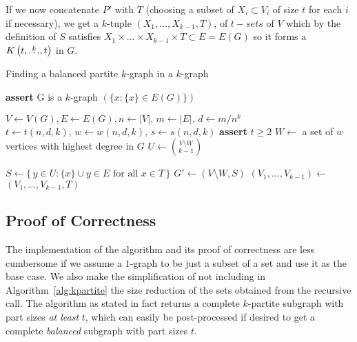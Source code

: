 If we now concatenate $P'$ with $T$ (choosing a subset of $X_i \subset V_i$ of size $t$ for each $i$ if necessary), we get
a $k$-tuple $(X_1, \dots, X_{k-1}, T)$, of $t-sets$ of $V$ %
which by the definition of $S$ satisfies
$X_1 \times \dots \times X_{k-1} \times T \subset E = E(G)$
so it forms a $K\left(t, \overset{k}{\dots}, t\right)$ in $G$.

\begin{algorithm}[H]
    \caption{Finding a balanced partite $k$-graph in a $k$-graph}
    \label{alg:kpartite}
    \begin{algorithmic}[1]
            \State \textbf{assert} G is a $k$-graph
             \label{line:base_case}
                \State \Return $(\{x : \{x\} \in E(G)\})$
            \EndIf

            \State $V \gets V(G), E \gets E(G), n \gets |V|,\, m \gets |E|,\, d \gets m/n^k$
            \State $t \gets t(n, d, k),\, w \gets w(n, d, k),\, s \gets s(n, d, k)$ \label{line:tws}
            \State \textbf{assert} $t \geq 2$ \label{line:min_t}
            \State $W \gets$ a set of $w$ vertices with highest degree in $G$ \label{line:W}
            \State $U \gets \binom{V\setminus W}{k-1}$

             \label{line:for}
                \State $S \gets \{\,y \in U \colon \{x\} \cup y \in E \text{ for all } x \in T\,\}$ \label{line:S}
                    \State $G' \gets (V \setminus W, S)$ \label{line:rec_call}
                    \State $(V_1, \dots, V_{k-1}) \gets$ 
                    \State \Return $(V_1, \dots, V_{k-1}, T)$ \label{line:return}
                \EndIf
            \EndFor
        \EndFunction
    \end{algorithmic}
\end{algorithm}

\subsection{Proof of Correctness} \label{subsec:proof-of-correctness}

The implementation of the algorithm and its proof of correctness are less cumbersome if we assume
a $1$-graph to be just a subset of a set and use it as the base case.
We also make the simplification of not including in Algorithm~\ref{alg:kpartite}
the size reduction of the sets obtained from the recursive call.
The algorithm as stated in fact returns a complete $k$-partite
subgraph with part sizes \emph{at least} $t$, which can easily be post-processed
if desired to get a complete \emph{balanced} subgraph with part sizes $t$.

